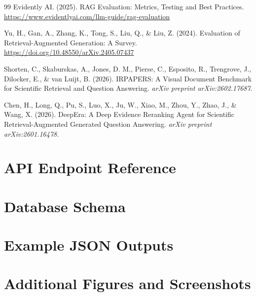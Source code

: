 \documentclass[12pt,a4paper]{report}
\begin{document}
\begin{thebibliography}{99}
Evidently AI. (2025). RAG Evaluation: Metrics, Testing and Best Practices.
\url{https://www.evidentlyai.com/llm-guide/rag-evaluation}

Yu, H., Gan, A., Zhang, K., Tong, S., Liu, Q., \& Liu, Z. (2024). Evaluation
of Retrieval-Augmented Generation: A Survey.
\url{https://doi.org/10.48550/arXiv.2405.07437}

Shorten, C., Skaburskas, A., Jones, D. M., Pierse, C., Esposito, R.,
Trengrove, J., Dilocker, E., \& van Luijt, B. (2026). IRPAPERS: A Visual
Document Benchmark for Scientific Retrieval and Question Answering.
\textit{arXiv preprint arXiv:2602.17687}.

Chen, H., Long, Q., Pu, S., Luo, X., Ju, W., Xiao, M., Zhou, Y., Zhao, J.,
\& Wang, X. (2026). DeepEra: A Deep Evidence Reranking Agent for Scientific
Retrieval-Augmented Generated Question Answering. \textit{arXiv preprint
arXiv:2601.16478}.

\end{thebibliography}

\appendix

\chapter{API Endpoint Reference}

\chapter{Database Schema}

\chapter{Example JSON Outputs}

\chapter{Additional Figures and Screenshots}
\end{document}
